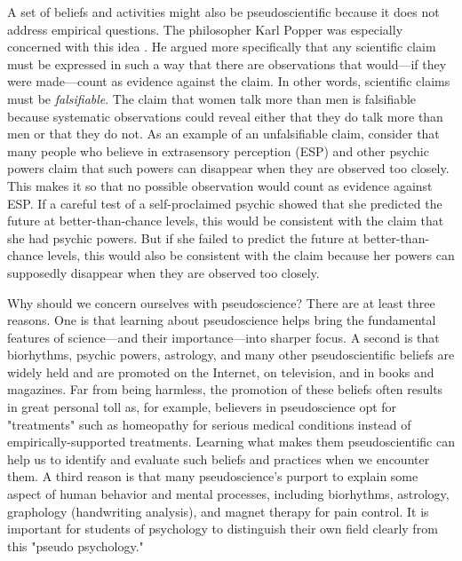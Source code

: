 A set of beliefs and activities might also be pseudoscientific because it does not address empirical questions. The philosopher Karl Popper was especially concerned with this idea \citep{popper_conjectures_2014}. He argued more specifically that any scientific claim must be expressed in such a way that there are observations that would---if they were made---count as evidence against the claim. In other words, scientific claims must be \emph{falsifiable}. The claim that women talk more than men is falsifiable because systematic observations could reveal either that they do talk more than men or that they do not. As an example of an unfalsifiable claim, consider that many people who believe in extrasensory perception (ESP) and other psychic powers claim that such powers can disappear when they are observed too closely. This makes it so that no possible observation would count as evidence against ESP. If a careful test of a self-proclaimed psychic showed that she predicted the future at better-than-chance levels, this would be consistent with the claim that she had psychic powers. But if she failed to predict the future at better-than-chance levels, this would also be consistent with the claim because her powers can supposedly disappear when they are observed too closely.

Why should we concern ourselves with pseudoscience? There are at least three reasons. One is that learning about pseudoscience helps bring the fundamental features of science---and their importance---into sharper focus. A second is that biorhythms, psychic powers, astrology, and many other pseudoscientific beliefs are widely held and are promoted on the Internet, on television, and in books and magazines. Far from being harmless, the promotion of these beliefs often results in great personal toll as, for example, believers in pseudoscience opt for "treatments" such as homeopathy for serious medical conditions instead of empirically-supported treatments. Learning what makes them pseudoscientific can help us to identify and evaluate such beliefs and practices when we encounter them. A third reason is that many pseudoscience's purport to explain some aspect of human behavior and mental processes, including biorhythms, astrology, graphology (handwriting analysis), and magnet therapy for pain control. It is important for students of psychology to distinguish their own field clearly from this "pseudo psychology."

